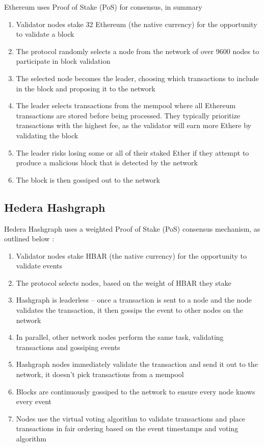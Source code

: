\documentclass[
	a4paper, %
	10pt, %
	unnumberedsections, %
	twoside, %
]{LTJournalArticle}
\begin{document}
Ethereum uses Proof of Stake (PoS) for consensus, in summary \cite{buterin_casper_2017,vitalik_buterin_incentives_2019,o_moindrot_proof_2017}\begin{enumerate}
\item Validator nodes stake 32 Ethereum (the native currency) for the opportunity to validate a block
\item The protocol randomly selects a node from the network of over 9600 nodes to participate in block validation
\item The selected node becomes the leader, choosing which transactions to include in the block and proposing it to the network
\item The leader selects transactions from the mempool where all Ethereum transactions are stored before being processed. They typically prioritize transactions with the highest fee, as the validator will earn more Ethere by validating the block
\item The leader risks losing some or all of their staked Ether if they attempt to produce a malicious block that is detected by the network
\item The block is then gossiped out to the network
\end{enumerate}

\subsection{Hedera Hashgraph}
Hedera Hashgraph uses a weighted Proof of Stake (PoS) consensus mechanism, as outlined below \cite{baird_swirlds_nodate}:
\begin{enumerate}
\item Validator nodes stake HBAR (the native currency) for the opportunity to validate events
\item The protocol selects nodes, based on the weight of HBAR they stake
\item Hashgraph is leaderless – once a transaction is sent to a node and the node validates the transaction, it then gossips the event to other nodes on the network
\item In parallel, other network nodes perform the same task, validating transactions and gossiping events
\item Hashgraph nodes immediately validate the transaction and send it out to the network, it doesn’t pick transactions from a mempool
\item Blocks are continuously gossiped to the network to ensure every node knows every event
\item Nodes use the virtual voting algorithm to validate transactions and place transactions in fair ordering based on the event timestamps and voting algorithm
\end{enumerate}
\end{document}
